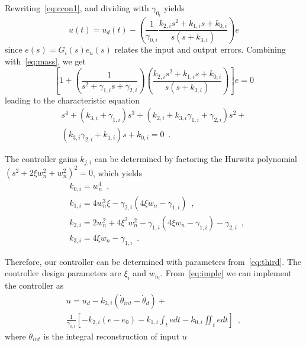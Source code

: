 \documentclass[letterpaper, 10pt, conference]{ieeeconf}      %
\begin{document}
\noindent Rewriting~\eqref{eq:ccon1}, and dividing with $\gamma_{0_i}$ yields %
%
\begin{equation}
        u(t) = u_d(t) - \left(\frac{1}{\gamma_{0,i}}\frac{k_{2,i}s^2+k_{1,i}s+k_{0,i}}{s(s+k_{3,i})}\right)e
        \label{eq:imple}
\end{equation}
%
since $e(s)=G_i(s)e_u(s)$ relates the input and output errors. Combining with~\eqref{eq:mass}, we get
%
\begin{equation}
    \left[1+\left( \frac{1}{s^2 + \gamma_{1,i} s + \gamma_{2,i}} \right) \left( \frac{k_{2,i}s^2+k_{1,i}s+k_{0,i}}{s(s+k_{3,i})}\right)\right]e=0
    \label{eq:both}
\end{equation}
%
leading to the characteristic equation 
\begin{equation}
\begin{aligned}
    s^4 + (k_{3,i}+\gamma_{1,i})s^3 + (k_{2,i} + k_{3,i}\gamma_{1,i}+\gamma_{2,i})s^2 +\\ (k_{3,i}\gamma_{2,i}+k_{1,i})s + k_{0,i} = 0\enspace.
    \label{eq:1}
    \end{aligned}
\end{equation}

The controller gains $k_{j,i}$ can be determined by factoring the Hurwitz polynomial %
%
    $(s^2 + 2\xi w_n^2+w_n^2)^2 = 0
$, %
%
which yields
\begin{equation}
    \begin{aligned}
        &k_{0,i} = w_n^4\enspace, \\
        &k_{1,i} = 4w_n^3\xi - \gamma_{2,i}(4\xi w_n-\gamma_{1,i})\enspace,\\
        &k_{2,i} = 2w_n^2 + 4\xi^2w_n^2 - \gamma_{1,i}(4\xi w_n - \gamma_{1,i}) - \gamma_{2,i}\enspace,\\
        &k_{3,i} = 4\xi w_n - \gamma_{1,i}\enspace.
    \end{aligned}
    \label{eq:third}
\end{equation}



Therefore, our controller can be determined with parameters from~\eqref{eq:third}. The controller design parameters are $\xi_i$ and $w_{n_i}$. From~\eqref{eq:imple} we can implement the controller as 
%
\begin{equation}
\begin{aligned}
    u = u_d - k_{3,i}(\dot{\theta}_{int}-\dot{\theta}_d) + \\ \frac{1}{\gamma_{0,i}}\left[ -k_{2,i}(e-e_0) - k_{1,i}\int_t e dt  - k_{0,i}\iint_t e dt \right] \enspace,
    \end{aligned}
    \label{eq:controlad}
\end{equation}
%
where $\theta_{int}$ is the integral reconstruction \cite{romero2014algebraic,blanco2022robust} of input $u$
\end{document}
